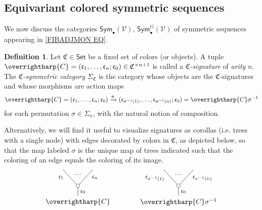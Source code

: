 \documentclass[a4paper,10pt
,draft
]{article}%
\numberwithin{equation}{section}
\numberwithin{figure}{section}
\theoremstyle{definition} %
\newtheorem{definition}[equation]{Definition}%
\newcommand{\vect}[1]{\text{\overrightharp{\ensuremath{#1}}}}
\newcommand{\V}{\ensuremath{\mathcal V}}
\newcommand{\1}{\ensuremath{\mathbbm 1}}%
\begin{document}
\subsection{Equivariant colored symmetric sequences}
\label{EQCOSYMSEQ SEC}

We now discuss the categories
$\mathsf{Sym}_{\bullet}(\V)$,
$\mathsf{Sym}^G_{\bullet}(\V)$
of symmetric sequences appearing in \eqref{FIBADJMON EQ}.


\begin{definition}\label{CSYM DEF}
	Let $\mathfrak {C} \in \mathsf{Set}$ be a fixed set of colors (or objects).
	A tuple
	$\vect C = (\mathfrak c_1, \dots, \mathfrak c_n; \mathfrak c_0) \in \mathfrak{C}^{\times n+1}$
	is called a \textit{$\mathfrak {C}$-signature} of \textit{arity} $n$.
	The \textit{$\mathfrak C$-symmetric category} $\Sigma_{\mathfrak C}$ is the category whose objects are the $\mathfrak{C}$-signatures and whose morphisms are action maps
	\begin{equation}\label{CSYM EQ1}
	\vect{C} =
	(\mathfrak c_1, \dots, \mathfrak c_n; \mathfrak c_0) \xrightarrow{\sigma} (\mathfrak c_{\sigma^{-1}(1)}, \dots, \mathfrak c_{\sigma^{-1}(n)}; \mathfrak c_0)
	= \vect{C} \sigma^{-1}
	\end{equation}
	for each permutation $\sigma \in \Sigma_n$, with the natural notion of composition.
	
	Alternatively, we will find it useful to visualize signatures as corollas (i.e. trees with a single node)
	with edges decorated by colors in $\mathfrak{C}$, as depicted below, so that the map labeled $\sigma$
	is the unique map of trees indicated such that the coloring of an edge equals the coloring of its image.
	\begin{equation}\label{CSYM EQ2}
	\begin{tikzpicture}
	[grow=up,auto,level distance=2.3em,every node/.style = {font=\footnotesize},dummy/.style={circle,draw,inner sep=0pt,minimum size=1.75mm}]
	
	\node at (0,0) [font=\normalsize]{$\vect{C}$}
	child{node [dummy] {}
		child{
			edge from parent node [swap,near end] {$\mathfrak c_n$} node [name=Kn] {}}
		child{
			edge from parent node [near end] {$\mathfrak c_1$}
			node [name=Kone,swap] {}}
		edge from parent node [swap] {$\mathfrak c_0$}
	};
	\draw [dotted,thick] (Kone) -- (Kn) ;
	\node at (5,0) [font=\normalsize] {$\vect{C} \sigma^{-1}
		$}
	child{node [dummy] {}
		child{
			edge from parent node [swap,near end] {$\mathfrak c_{\sigma^{-1}(n)}$} node [name=Kn] {}}
		child{
			edge from parent node [near end] {$\mathfrak c_{\sigma^{-1}(1)}$}
			node [name=Kone,swap] {}}
		edge from parent node [swap] {$\mathfrak c_0$}
	};
	\draw [dotted,thick] (Kone) -- (Kn) ;
	

\end{tikzpicture}
\end{equation}
\end{definition}
\end{document}
